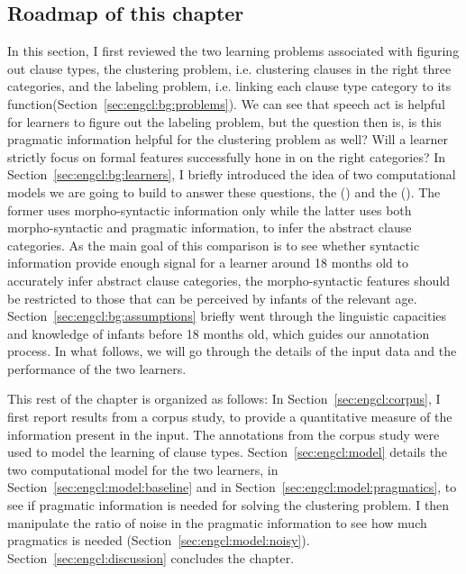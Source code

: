 \subsection{Roadmap of this chapter}\label{sec:engcl:bg:roadmap}
In this section, I first reviewed the two learning problems associated with figuring out clause types, the clustering problem, i.e. clustering clauses in the right three categories, and the labeling problem, i.e. linking each clause type category to its function(Section~\ref{sec:engcl:bg:problems}). We can see that speech act is helpful for learners to figure out the labeling problem, but the question then is, is this pragmatic information helpful for the clustering problem as well? Will a learner strictly focus on formal features successfully hone in on the right categories? In Section~\ref{sec:engcl:bg:learners}, I briefly introduced the idea of two computational models we are going to build to answer these questions, the \distlearner{} (\dlearnerabbr{}) and the \praglearner{} (\plearnerabbr{}). The former uses morpho-syntactic information only while the latter uses both morpho-syntactic and pragmatic information, to infer the abstract clause categories. As the main goal of this comparison is to see whether syntactic information provide enough signal for a learner around 18 months old to accurately infer abstract clause categories, the morpho-syntactic features should be restricted to those that can be perceived by infants of the relevant age. Section~\ref{sec:engcl:bg:assumptions} briefly went through the linguistic capacities and knowledge of infants before 18 months old, which guides our annotation process. In what follows, we will go through the details of the input data and the performance of the two learners.

This rest of the chapter is organized as follows: In Section~\ref{sec:engcl:corpus}, I first report results from a corpus study, to provide a quantitative measure of the information present in the input. The annotations from the corpus study were used to model the learning of clause types.  Section~\ref{sec:engcl:model} details the two computational model for the two learners, \dlearnerabbr{} in Section~\ref{sec:engcl:model:baseline} and \plearnerabbr{} in Section~\ref{sec:engcl:model:pragmatics}, to see if pragmatic information is needed for solving the clustering problem. I then manipulate the ratio of noise in the pragmatic information to see how much pragmatics is needed (Section~\ref{sec:engcl:model:noisy}). Section~\ref{sec:engcl:discussion} concludes the chapter.  %



